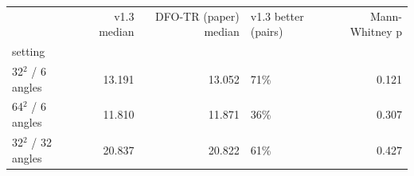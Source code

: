\begin{tabular}{lrrlr}
\toprule
 & v1.3 median & DFO-TR (paper) median & v1.3 better (pairs) & Mann-Whitney p \\
setting &  &  &  &  \\
\midrule
32$^2$ / 6 angles & 13.191 & 13.052 & 71\% & 0.121 \\
64$^2$ / 6 angles & 11.810 & 11.871 & 36\% & 0.307 \\
32$^2$ / 32 angles & 20.837 & 20.822 & 61\% & 0.427 \\
\bottomrule
\end{tabular}

